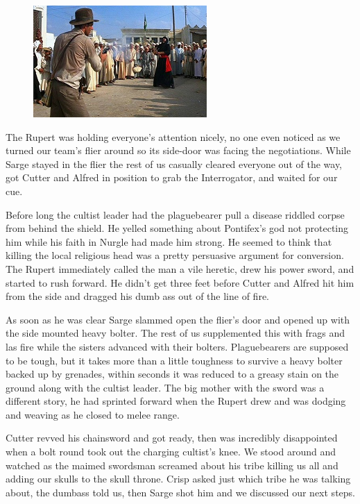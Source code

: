 \begin{figure}
	\begin{center}
		\includegraphics[width=\figwidth]{pics/6/27.png}
	\end{center}
\end{figure}
The Rupert was holding everyone's attention nicely, no one even noticed as we turned our team's flier around so its side-door was facing the negotiations. 
While Sarge stayed in the flier the rest of us casually cleared everyone out of the way, got Cutter and Alfred in position to grab the Interrogator, and waited for our cue.

Before long the cultist leader had the plaguebearer pull a disease riddled corpse from behind the shield. 
He yelled something about Pontifex's god not protecting him while his faith in Nurgle had made him strong. 
He seemed to think that killing the local religious head was a pretty persuasive argument for conversion. 
The Rupert immediately called the man a vile heretic, drew his power sword, and started to rush forward. 
He didn't get three feet before Cutter and Alfred hit him from the side and dragged his dumb ass out of the line of fire.

As soon as he was clear Sarge slammed open the flier's door and opened up with the side mounted heavy bolter. 
The rest of us supplemented this with frags and las fire while the sisters advanced with their bolters. 
Plaguebearers are supposed to be tough, but it takes more than a little toughness to survive a heavy bolter backed up by grenades, within seconds it was reduced to a greasy stain on the ground along with the cultist leader. 
The big mother with the sword was a different story, he had sprinted forward when the Rupert drew and was dodging and weaving as he closed to melee range.

Cutter revved his chainsword and got ready, then was incredibly disappointed when a bolt round took out the charging cultist's knee. 
We stood around and watched as the maimed swordsman screamed about his tribe killing us all and adding our skulls to the skull throne. 
Crisp asked just which tribe he was talking about, the dumbass told us, then Sarge shot him and we discussed our next steps.

